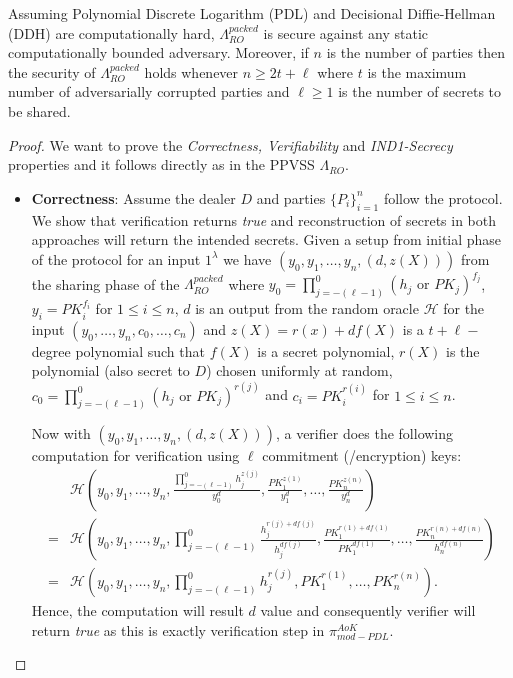 \begin{theorem}\label{th:thesis-final-lambda_ro}
  Assuming Polynomial Discrete Logarithm (PDL) and Decisional Diffie-Hellman (DDH) are 
  computationally hard, $\Lambda_{RO}^{packed}$ is secure against any 
  static computationally bounded adversary. Moreover, if $n$ is the number of parties then the 
  security of $\Lambda_{RO}^{packed}$ holds whenever $n\geq 2t+\ell$ where $t$ is the maximum number of
  adversarially corrupted parties and $\ell\geq 1$ is the number of secrets to be shared.
\end{theorem}
\begin{proof}
  We want to prove the \textit{Correctness, Verifiability} and \textit{IND1-Secrecy} properties and it follows 
  directly as in the PPVSS $\Lambda_{RO}$.
  \begin{itemize}
    \item \textbf{Correctness}: Assume the dealer $D$ and parties $\{P_i\}_{i=1}^n$ follow the protocol. We show that 
      verification returns \textit{true} and reconstruction of secrets in both approaches 
      will return the intended secrets. Given a 
      setup from initial phase of the protocol for an input $1^\lambda$ we have $(y_0,y_1,\dots,y_n,(d,z(X)))$ from 
      the sharing phase of the $\Lambda_{RO}^{packed}$ where 
      $y_0=\prod_{j=-(\ell-1)}^{0}(h_j\text{ or }PK_j)^{f_j}$, $y_i=PK_i^{f_i}$ for $1\leq i\leq n$, $d$ is an output 
      from the random oracle $\mathcal{H}$ for the input $(y_0,\dots,y_n,c_0,\dots,c_n)$ and $z(X)=r(x)+df(X)$ 
      is a $t+\ell-$degree polynomial such that $f(X)$ is a secret polynomial, $r(X)$ is the polynomial (also secret to $D$) 
      chosen uniformly at random, $c_0=\prod_{j=-(\ell-1)}^{0}(h_j\text{ or }PK_j)^{r(j)}$ and $c_i=PK_i^{r(i)}$ for $1\leq i\leq n$.\par 

      Now with $(y_0,y_1,\dots,y_n,(d,z(X)))$, a verifier does the following computation for 
      verification using $\ell$ commitment (/encryption) keys:
      \begin{align*}
        &\mathcal{H}(y_0,y_1,\dots,y_n,\frac{\prod_{j=-(\ell-1)}^{0}h_j^{z(j)}}{y_0^d},\frac{PK_1^{z(1)}}{y_1^d},\dots,\frac{PK_n^{z(n)}}{y_n^d})\\
        =&\mathcal{H}(y_0,y_1,\dots,y_n,\prod_{j=-(\ell-1)}^{0}\frac{h_j^{r(j)+df(j)}}{h_j^{df(j)}},\frac{PK_1^{r(1)+df(1)}}{PK_1^{df(1)}},\dots,\frac{PK_n^{r(n)+df(n)}}{h_n^{df(n)}})\\
        =&\mathcal{H}(y_0,y_1,\dots,y_n,\prod_{j=-(\ell-1)}^{0}h_j^{r(j)},PK_1^{r(1)},\dots,PK_n^{r(n)}).
      \end{align*}
      Hence, the computation will result $d$ value and consequently verifier will return 
      \textit{true} as this is exactly verification step in $\pi_{mod-PDL}^{AoK}$.\par 
      

\end{itemize}
\end{proof}
